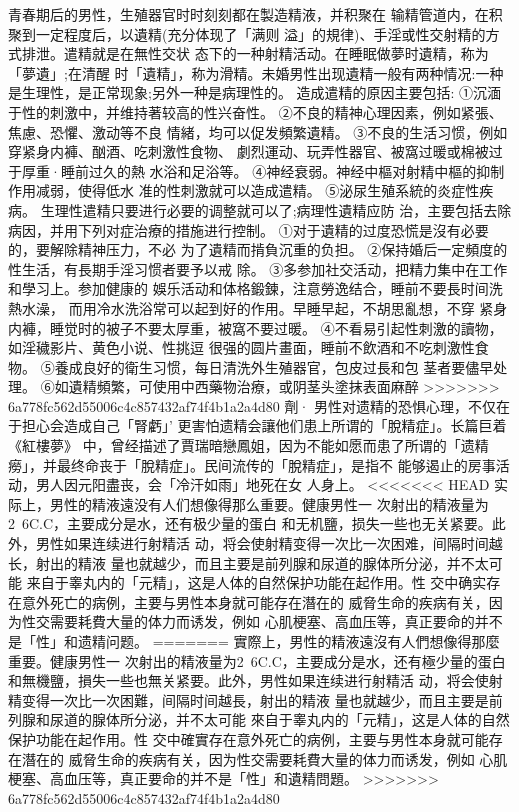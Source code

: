 \documentclass[12pt,UTF8]{ctexbook}
\begin{document}
青春期后的男性，生殖器官时时刻刻都在製造精液，并积聚在
输精管道内，在积聚到一定程度后，以遺精(充分体现了「满则
溢」的規律)、手淫或性交射精的方式排泄。遣精就是在無性交状
态下的一种射精活动。在睡眠做夢时遺精，称为「夢遺」;在清醒
时「遺精」，称为滑精。未婚男性出现遺精一般有两种情况:一种
是生理性，是正常现象;另外一种是病理性的。
造成遣精的原因主要包括:
①沉湎于性的刺激中，并维持著较高的性兴奋性。
②不良的精神心理因素，例如紧張、焦慮、恐懼、激动等不良
情緒，均可以促发頻繁遺精。
③不良的生活习惯，例如穿紧身内褲、酗酒、吃刺激性食物、
劇烈運动、玩弄性器官、被窩过暖或棉被过于厚重·睡前过久的熱
水浴和足浴等。
④神经衰弱。神经中樞对射精中樞的抑制作用减弱，使得低水
准的性刺激就可以造成遣精。
⑤泌尿生殖系統的炎症性疾病。
生理性遣精只要进行必要的调整就可以了;病理性遺精应防
治，主要包括去除病因，并用下列对症治療的措施进行控制。
①对于遺精的过度恐慌是沒有必要的，要解除精神压力，不必
为了遺精而掯負沉重的负担。
②保持婚后一定頻度的性生活，有長期手淫习惯者要予以戒
除。
③多参加社交活动，把精力集中在工作和學习上。参加健康的
娛乐活动和体格鍛鍊，注意勞逸结合，睡前不要長时间洗熱水澡，
而用冷水洗浴常可以起到好的作用。早睡早起，不胡思亂想，不穿
紧身内褲，睡觉时的被子不要太厚重，被窩不要过暖。
④不看易引起性刺激的讀物，如淫穢影片、黄色小说、性挑逗
很强的圆片畫面，睡前不飲酒和不吃刺激性食物。
⑤養成良好的衛生习惯，每日清洗外生殖器官，包皮过長和包
茎者要儘早处理。
⑥如遺精頻繁，可使用中西藥物治療，或阴茎头塗抹表面麻醉
>>>>>>> 6a778fc562d55006c4c857432af74f4b1a2a4d80
劑·
男性对遗精的恐惧心理，不仅在于担心会造成自己「腎虧」’
更害怕遗精会讓他们患上所谓的「脫精症」。长篇巨着《紅樓夢》
中，曾经描述了賈瑞暗戀鳳姐，因为不能如愿而患了所谓的「遗精
癆」，并最终命丧于「脫精症」。民间流传的「脫精症」，是指不
能够遏止的房事活动，男人因元阳盡丧，会「冷汗如雨」地死在女
人身上。
<<<<<<< HEAD
实际上，男性的精液遠没有人们想像得那么重要。健康男性一
次射出的精液量为2~6C.C，主要成分是水，还有极少量的蛋白
和无机鹽，损失一些也无关紧要。此外，男性如果连续进行射精活
动，将会使射精变得一次比一次困难，间隔时间越长，射出的精液
量也就越少，而且主要是前列腺和尿道的腺体所分泌，并不太可能
来自于睾丸内的「元精」，这是人体的自然保护功能在起作用。性
交中确实存在意外死亡的病例，主要与男性本身就可能存在潛在的
威脅生命的疾病有关，因为性交需要耗費大量的体力而诱发，例如
心肌梗塞、高血压等，真正要命的并不是「性」和遗精问题。
=======
實際上，男性的精液遠沒有人們想像得那麼重要。健康男性一
次射出的精液量为2~6C.C，主要成分是水，还有極少量的蛋白
和無機鹽，損失一些也無关紧要。此外，男性如果连续进行射精活
动，将会使射精变得一次比一次困難，间隔时间越長，射出的精液
量也就越少，而且主要是前列腺和尿道的腺体所分泌，并不太可能
來自于睾丸内的「元精」，这是人体的自然保护功能在起作用。性
交中確實存在意外死亡的病例，主要与男性本身就可能存在潛在的
威脅生命的疾病有关，因为性交需要耗費大量的体力而诱发，例如
心肌梗塞、高血压等，真正要命的并不是「性」和遺精問題。
>>>>>>> 6a778fc562d55006c4c857432af74f4b1a2a4d80
\end{document}
